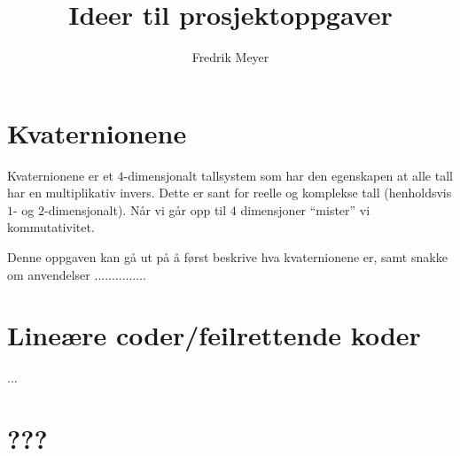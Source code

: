 \documentclass[11pt, english, a4paper]{article}
\begin{document}
\title{Ideer til prosjektoppgaver}
\author{Fredrik Meyer}
\maketitle 

\section{Kvaternionene}

Kvaternionene er et $4$-dimensjonalt tallsystem som har den egenskapen at alle tall har en multiplikativ invers. Dette er sant for reelle og komplekse tall (henholdsvis $1$- og $2$-dimensjonalt). Når vi går opp til $4$ dimensjoner ``mister'' vi kommutativitet.

Denne oppgaven kan gå ut på å først beskrive hva kvaternionene er, samt snakke om anvendelser ...............

\section{Lineære coder/feilrettende koder}

...

\section{???}
\end{document}
